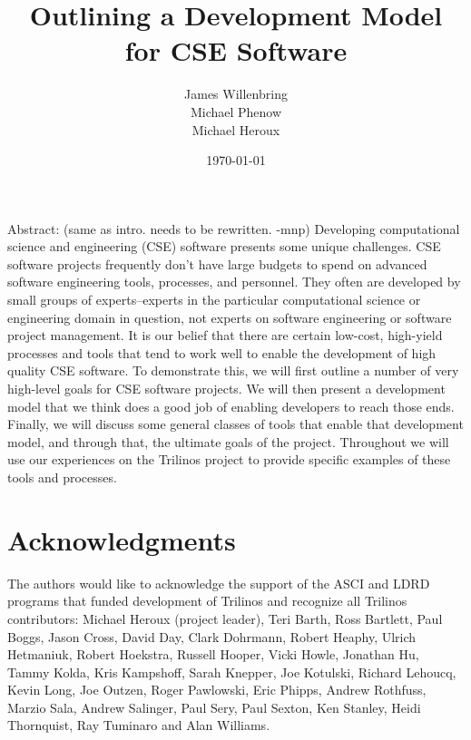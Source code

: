 \documentclass[12pt,relax]{article}
\title{Outlining a Development Model for CSE Software}
\author{
James Willenbring\\
Michael Phenow\\
Michael Heroux\\
}
\date{\today} %
\begin{document}
\maketitle



Abstract:  (same as intro. needs to be rewritten.  -mnp)
Developing computational science and engineering (CSE) software presents some 
unique challenges.  CSE software projects frequently don't have large budgets 
to spend on advanced software engineering tools, processes, and personnel.  
They often are developed by small groups of experts--experts in the particular 
computational science or engineering domain in question, not experts on 
software engineering or software project management.  It is our belief that 
there are certain low-cost, high-yield processes and tools that tend to work 
well to enable the development of high quality CSE software.  To demonstrate 
this, we will first outline a number of very high-level goals for CSE software 
projects.  We will then present a development model that we think does a good 
job of enabling developers to reach those ends.  Finally, we will discuss some 
general classes of tools that enable that development model, and through that, 
the ultimate goals of the project.  Throughout we will use our experiences on 
the Trilinos project to provide specific examples of these tools and processes.


\clearpage


\section*{Acknowledgments}

The authors would like to acknowledge the support of the ASCI and LDRD programs 
that funded development of Trilinos and recognize all Trilinos contributors:
Michael Heroux (project leader), Teri Barth, Ross Bartlett, Paul Boggs, Jason
Cross, David Day, Clark Dohrmann, Robert Heaphy, Ulrich Hetmaniuk, Robert
Hoekstra, Russell Hooper, Vicki Howle, Jonathan Hu, Tammy Kolda, Kris
Kampshoff, Sarah Knepper, Joe Kotulski, Richard Lehoucq, Kevin Long, Joe
Outzen, Roger Pawlowski, Eric Phipps, Andrew Rothfuss, Marzio Sala, Andrew
Salinger, Paul Sery, Paul Sexton, Ken Stanley, Heidi Thornquist, Ray Tuminaro
and Alan Williams.
\end{document}
